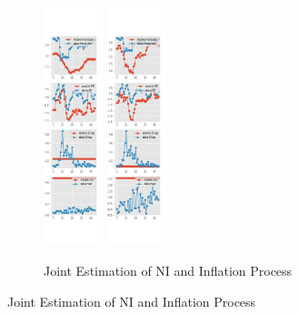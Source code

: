 \documentclass[]{article}
\begin{document}
\begin{figure}[ht]
\begin{subfigure}[b]{\textwidth}
		\includegraphics[width=0.19\textwidth]{figures/spf_ni_est_diag3.png}
		\includegraphics[width=0.19\textwidth]{figures/spf_ni_est_diag4.png}
	\end{subfigure}
	\vspace{1em}
	\vfill
	\begin{subfigure}[b]{\textwidth}
		\centering
		\caption{Joint Estimation of NI and Inflation Process}
		\label{NI_diag_joint_SPF}

\end{subfigure}
\end{figure}
\end{document}
